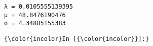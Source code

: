\documentclass{article}
\begin{document}
    \begin{Verbatim}[commandchars=\\\{\}]
λ = 0.0105555139395
μ = 48.8476190476
σ = 4.34885155383
    \end{Verbatim}

    \begin{Verbatim}[commandchars=\\\{\}]
{\color{incolor}In [{\color{incolor}}]:} 
\end{Verbatim}


    
    
    
    
\end{document}
